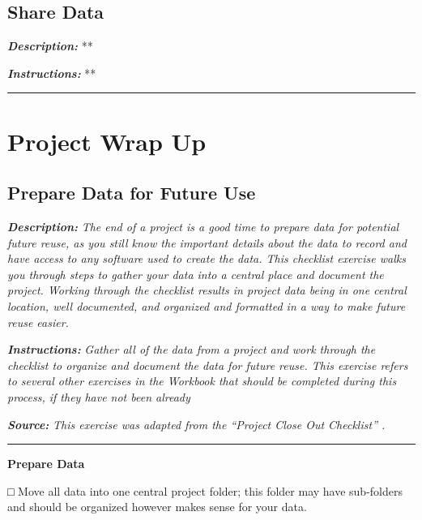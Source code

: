 \documentclass[
]{book}
\begin{document}
\hypertarget{share-data}{%
\section{Share Data}\label{share-data}}

\textbf{\emph{Description:}} **

\textbf{\emph{Instructions:}} **

\begin{center}\rule{0.5\linewidth}{0.5pt}\end{center}

\hypertarget{project-wrap-up}{%
\chapter{Project Wrap Up}\label{project-wrap-up}}

\hypertarget{future-use}{%
\section{Prepare Data for Future Use}\label{future-use}}

\textbf{\emph{Description:}} \emph{The end of a project is a good time to prepare data for potential future reuse, as you still know the important details about the data to record and have access to any software used to create the data. This checklist exercise walks you through steps to gather your data into a central place and document the project. Working through the checklist results in project data being in one central location, well documented, and organized and formatted in a way to make future reuse easier.}

\textbf{\emph{Instructions:}} \emph{Gather all of the data from a project and work through the checklist to organize and document the data for future reuse. This exercise refers to several other exercises in the Workbook that should be completed during this process, if they have not been already}

\textbf{\emph{Source:}} \emph{This exercise was adapted from the ``Project Close Out Checklist'' \citep{briney_project_2020}.}

\begin{center}\rule{0.5\linewidth}{0.5pt}\end{center}

\textbf{Prepare Data}

□ Move all data into one central project folder; this folder may have sub-folders and should be organized however makes sense for your data.
\end{document}
